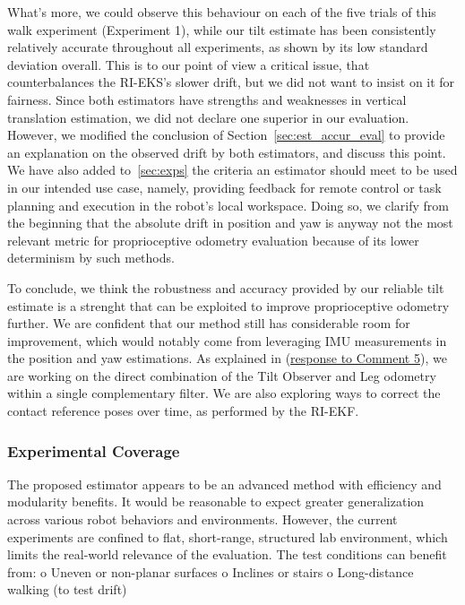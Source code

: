 What's more, we could observe this behaviour on each of the five trials of this walk experiment (Experiment 1), while our tilt estimate has been consistently relatively accurate throughout all experiments, as shown by its low standard deviation overall.
This is to our point of view a critical issue, that counterbalances the RI-EKS's slower drift, but we did not want to insist on it for fairness. 
Since both estimators have strengths and weaknesses in vertical translation estimation, we did not declare one superior in our evaluation. However, we modified the conclusion of Section~\ref{sec:est_accur_eval} to provide an explanation on the observed drift by both estimators, and discuss this point. We have also added to~\ref{sec:exps} the criteria an estimator should meet to be used in our intended use case, namely, providing feedback for remote control or task planning and execution in the robot's local workspace. Doing so, we clarify from the beginning that the absolute drift in position and yaw is anyway not the most relevant metric for proprioceptive odometry evaluation because of its lower determinism by such methods. 



To conclude, we think the robustness and accuracy provided by our reliable tilt estimate is a strenght that can be exploited to improve proprioceptive odometry further. We are confident that our method still has considerable room for improvement, which would notably come from leveraging IMU measurements in the position and yaw estimations. As explained in (\hyperlink{CommentSe3Fusion}{response to Comment 5}), we are working on the direct combination of the Tilt Observer and Leg odometry within a single complementary filter. We are also exploring ways to correct the contact reference poses over time, as performed by the RI-EKF.



\subsubsection{Experimental Coverage}

\begin{revquote}
The proposed estimator appears to be an advanced method with efficiency and modularity benefits. It would be reasonable to expect greater generalization across various robot behaviors and environments.
However, the current experiments are confined to flat, short-range, structured lab environment, which limits the real-world relevance of the evaluation.
The test conditions can benefit from:
    o Uneven or non-planar surfaces
    o Inclines or stairs
    o Long-distance walking (to test drift)
\end{revquote}

